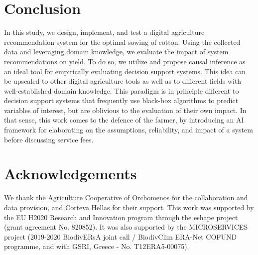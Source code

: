 \documentclass[letterpaper]{article} %
\begin{document}
\vspace{-0.93mm}
\section{Conclusion}

In this study, we design, implement, and test a digital agriculture recommendation system for the optimal sowing of cotton. Using the collected data and leveraging domain knowledge, we evaluate the impact of system recommendations on yield. To do so, we utilize and propose causal inference as an ideal tool for empirically evaluating decision support systems.
This idea can be upscaled to other digital agriculture tools as well as to different fields with well-established domain knowledge. This paradigm is in principle different to decision support systems that frequently use black-box algorithms to predict variables of interest, but are oblivious to the evaluation of their own impact. In that sense, this work comes to the defence of the farmer, by introducing an AI framework for elaborating on the assumptions, reliability, and impact of a system before discussing service fees.

\vspace{-0.81mm}
\section{Acknowledgements}

We thank the Agriculture Cooperative of Orchomenos for the collaboration and data provision, and Corteva Hellas for their support. This work was supported by the EU H2020 Research and Innovation program through the eshape project (grant agreement No. 820852). It was also supported by the MICROSERVICES project (2019-2020 BiodivERsA joint call / BiodivClim ERA-Net COFUND programme, and with GSRI, Greece - No. T12ERA5-00075).
\end{document}

